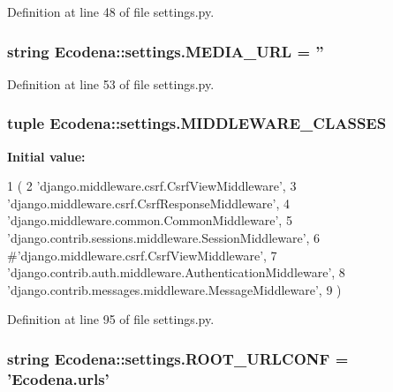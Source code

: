 Definition at line 48 of file settings.py.

\hypertarget{namespace_ecodena_1_1settings_aa61576d13b35ee05934d15ca81f0fe14}{
\subsubsection[{MEDIA\_\-URL}]{\setlength{\rightskip}{0pt plus 5cm}string {\bf Ecodena::settings.MEDIA\_\-URL} = ''}}
\label{d1/d62/namespace_ecodena_1_1settings_aa61576d13b35ee05934d15ca81f0fe14}


Definition at line 53 of file settings.py.

\hypertarget{namespace_ecodena_1_1settings_a9877a888d62dba39bb7e8749c7f41f76}{
\subsubsection[{MIDDLEWARE\_\-CLASSES}]{\setlength{\rightskip}{0pt plus 5cm}tuple {\bf Ecodena::settings.MIDDLEWARE\_\-CLASSES}}}
\label{d1/d62/namespace_ecodena_1_1settings_a9877a888d62dba39bb7e8749c7f41f76}
{\bfseries Initial value:}
\begin{DoxyCode}
1 (
2         'django.middleware.csrf.CsrfViewMiddleware',
3         'django.middleware.csrf.CsrfResponseMiddleware',
4     'django.middleware.common.CommonMiddleware',
5     'django.contrib.sessions.middleware.SessionMiddleware',
6     #'django.middleware.csrf.CsrfViewMiddleware',
7     'django.contrib.auth.middleware.AuthenticationMiddleware',
8     'django.contrib.messages.middleware.MessageMiddleware',
9 )
\end{DoxyCode}


Definition at line 95 of file settings.py.

\hypertarget{namespace_ecodena_1_1settings_a961361114e369d434f9beba128ae2a60}{
\subsubsection[{ROOT\_\-URLCONF}]{\setlength{\rightskip}{0pt plus 5cm}string {\bf Ecodena::settings.ROOT\_\-URLCONF} = 'Ecodena.urls'}}
\label{d1/d62/namespace_ecodena_1_1settings_a961361114e369d434f9beba128ae2a60}



